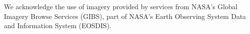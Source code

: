 \documentclass[amt, manuscript]{copernicus}
\begin{document}









































\begin{acknowledgements}


We acknowledge the use of imagery provided by services from NASA's Global Imagery Browse Services (GIBS), part of NASA's Earth Observing System Data and Information System (EOSDIS).

\end{acknowledgements}
\end{document}
